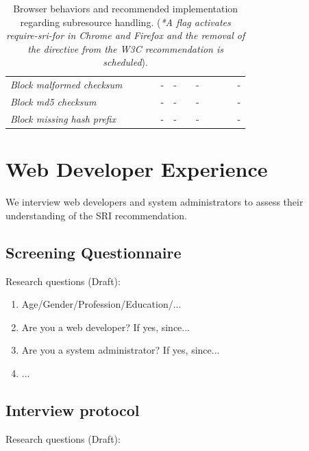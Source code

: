 \documentclass[sigconf,table]{acmart}
\def\nosymbol{\ding{55}}
\def\nasymbol{-}
\begin{document}
\begin{table}[h]
\begin{tabular}{l|cccccc|cccc|c}
\textit{Block malformed checksum	}				& \nosymbol & \nosymbol & \nosymbol & \nasymbol & \nasymbol & \nosymbol & \nasymbol & \nosymbol & \nosymbol & \nosymbol & \nasymbol \\
\textit{Block md5 checksum}						& \nosymbol & \nosymbol & \nosymbol & \nasymbol & \nasymbol & \nosymbol & \nasymbol & \nosymbol & \nosymbol & \nosymbol & \nasymbol \\
\textit{Block missing hash prefix}				& \nosymbol & \nosymbol & \nosymbol & \nasymbol & \nasymbol & \nosymbol & \nasymbol & \nosymbol & \nosymbol & \nosymbol & \nasymbol \\
\bottomrule
\end{tabular}
\caption{Browser behaviors and recommended implementation regarding subresource handling. (\textit{*A flag activates require-sri-for in Chrome and Firefox and the removal of the directive from the W3C recommendation is scheduled}).}
\label{tbl:browser-support}
\end{table}

\section{Web Developer Experience}

We interview web developers and system administrators to assess their understanding of the SRI recommendation.

\subsection{Screening Questionnaire}

Research questions (Draft):

\begin{enumerate}
	\item Age/Gender/Profession/Education/...
	\item Are you a web developer? If yes, since...
	\item Are you a system administrator? If yes, since...
	\item ...
\end{enumerate}


\subsection{Interview protocol}

Research questions (Draft):
\end{document}
